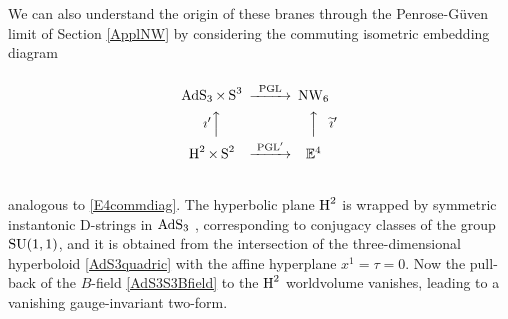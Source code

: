 We can also understand the origin of these branes through the Penrose-G\"uven
limit of Section \ref{ApplNW} by considering the commuting isometric embedding
diagram
\begin{equation}
  \label{E4commdiagH2}
  \begin{CD}
   @.\\
    \AdS_3 \times \S^3             @>\text{PGL}>> \NW_6\\
    \text{$\imath^{ \prime}  $}@AAA
@AAA\text{$\widetilde{\imath}^{ \prime}$}\\
           \Hyp^2\times\S^2    @>\text{PGL$^{ \prime}$}>> \E^4\\
   @.
  \end{CD}
\end{equation}
analogous to \eqref{E4commdiag}. The hyperbolic plane $\operatorname{H}^2$ is wrapped by
symmetric instantonic D-strings in $\operatorname{AdS}_3$ \cite{Stanciu3}, corresponding to
conjugacy classes of the group ${\rm SU}(1,1)$, and it is obtained from the
intersection of the three-dimensional hyperboloid \eqref{AdS3quadric} with the
affine hyperplane $x^1=\tau=0$. Now the pull-back of the $B$-field
\eqref{AdS3S3Bfield} to the $\operatorname{H}^2$ worldvolume vanishes, leading to a
vanishing gauge-invariant two-form.

